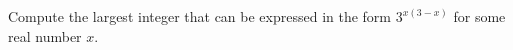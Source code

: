 Compute the largest integer that can be expressed in the form $3^{x(3-x)}$ for some real number $x$.
